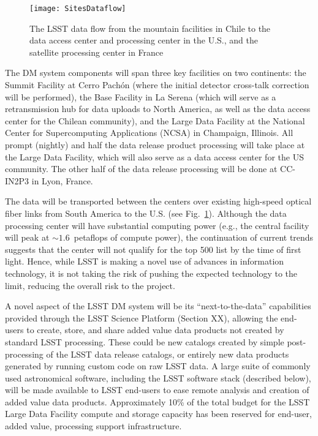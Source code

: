 \begin{figure}
\hskip 0.25in
\texttt{[image: SitesDataflow]}
\caption{The LSST data flow from the mountain facilities in
Chile to the data access center and processing center in the U.S., and 
the satellite processing center in France}
\label{Fig:DM2}
\end{figure}

The DM system components will span three key facilities on two
continents: the Summit Facility at  Cerro Pach\'on (where the initial
detector cross-talk
correction will be performed), the Base Facility in La Serena (which will serve
as a retransmission hub for data
uploads to North America, as well as the data access center for the Chilean
community), and the Large Data Facility at the National Center
for Supercomputing Applications (NCSA) in Champaign, Illinois.
All prompt (nightly) and half the data release product processing will take place at the
Large Data Facility, which will also serve as a data access center
for the US community.
The other half of the data release processing will be done at CC-IN2P3 in
Lyon, France.

The data will be transported between the centers over existing high-speed optical fiber
links from South America to the U.S. (see Fig.~\ref{Fig:DM2}).
Although the data processing center will have substantial computing
power (e.g., the central facility will peak at $\sim 1.6$~petaflops of
compute power), the continuation of current trends suggests that the center will
not qualify for the top 500 list by the time of first light.
Hence, while LSST is making a novel use of advances in information technology,
it is not taking the risk of pushing the expected technology to the limit, reducing
the overall risk to the project.

A novel aspect of the LSST DM system will be its ``next-to-the-data''
capabilities provided through the LSST Science Platform (Section XX), 
allowing the end-users to create, store, and share
added value data products not created by standard LSST processing. These
could be new catalogs created by simple post-processing of the LSST
data release catalogs, or entirely new data products generated by
running custom code on raw LSST data. A large suite of commonly used
astronomical software, including the LSST software stack (described
below), will be made available to LSST end-users to ease remote analysis
and creation of added value data products. Approximately 10\% of the total
budget for the LSST Large Data Facility compute and storage capacity has
been reserved for end-user, added value, processing support
infrastructure.

